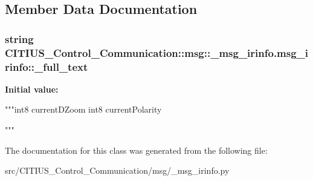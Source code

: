 \subsection{\-Member \-Data \-Documentation}
\hypertarget{class_c_i_t_i_u_s___control___communication_1_1msg_1_1__msg__irinfo_1_1msg__irinfo_adb7bf7dc1f9eada1fd3f69718e21309f}{
\subsubsection[{\-\_\-full\-\_\-text}]{\setlength{\rightskip}{0pt plus 5cm}string \-C\-I\-T\-I\-U\-S\-\_\-\-Control\-\_\-\-Communication\-::msg\-::\-\_\-msg\-\_\-irinfo.\-msg\-\_\-irinfo\-::\-\_\-full\-\_\-text}}\label{class_c_i_t_i_u_s___control___communication_1_1msg_1_1__msg__irinfo_1_1msg__irinfo_adb7bf7dc1f9eada1fd3f69718e21309f}
{\bfseries \-Initial value\-:}
\begin{DoxyCode}
"""int8 currentDZoom
int8 currentPolarity

"""
\end{DoxyCode}


\-The documentation for this class was generated from the following file\-:\begin{DoxyCompactItemize}
\item 
src/\-C\-I\-T\-I\-U\-S\-\_\-\-Control\-\_\-\-Communication/msg/\-\_\-msg\-\_\-irinfo.\-py\end{DoxyCompactItemize}
